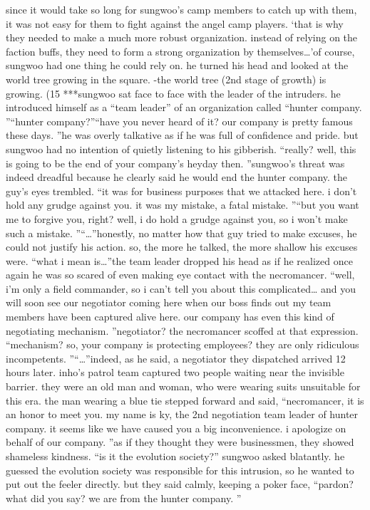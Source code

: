  since it would take so long for sungwoo’s camp members to catch up with them, it was not easy for them to fight against the angel camp players.
‘that is why they needed to make a much more robust organization.
 instead of relying on the faction buffs, they need to form a strong organization by themselves…’of course, sungwoo had one thing he could rely on.
 he turned his head and looked at the world tree growing in the square.
-the world tree (2nd stage of growth) is growing.
 (15%
***sungwoo sat face to face with the leader of the intruders.
 he introduced himself as a “team leader” of an organization called “hunter company.
”“hunter company?”“have you never heard of it? our company is pretty famous these days.
”he was overly talkative as if he was full of confidence and pride.
but sungwoo had no intention of quietly listening to his gibberish.
“really? well, this is going to be the end of your company’s heyday then.
”sungwoo’s threat was indeed dreadful because he clearly said he would end the hunter company.
 the guy’s eyes trembled.
“it was for business purposes that we attacked here.
 i don’t hold any grudge against you.
 it was my mistake, a fatal mistake.
”“but you want me to forgive you, right? well, i do hold a grudge against you, so i won’t make such a mistake.
”“…”honestly, no matter how that guy tried to make excuses, he could not justify his action.
 so, the more he talked, the more shallow his excuses were.
“what i mean is…”the team leader dropped his head as if he realized once again he was so scared of even making eye contact with the necromancer.
“well, i’m only a field commander, so i can’t tell you about this complicated… and you will soon see our negotiator coming here when our boss finds out my team members have been captured alive here.
 our company has even this kind of negotiating mechanism.
”negotiator? the necromancer scoffed at that expression.
“mechanism? so, your company is protecting employees? they are only ridiculous incompetents.
”“…”indeed, as he said, a negotiator they dispatched arrived 12 hours later.
inho’s patrol team captured two people waiting near the invisible barrier.
they were an old man and woman, who were wearing suits unsuitable for this era.
the man wearing a blue tie stepped forward and said, “necromancer, it is an honor to meet you.
 my name is ky, the 2nd negotiation team leader of hunter company.
 it seems like we have caused you a big inconvenience.
 i apologize on behalf of our company.
”as if they thought they were businessmen, they showed shameless kindness.
“is it the evolution society?” sungwoo asked blatantly.
he guessed the evolution society was responsible for this intrusion, so he wanted to put out the feeler directly.
but they said calmly, keeping a poker face, “pardon? what did you say? we are from the hunter company.
”

